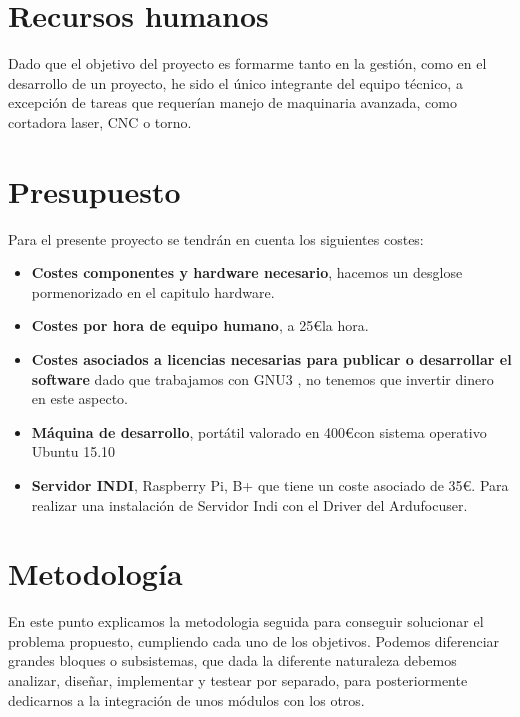 \begin{itemize}
\begin{itemize}
\begin{itemize}
\section{Recursos humanos}

Dado que el objetivo del proyecto es formarme tanto en la gestión, como en el desarrollo de un proyecto, he sido el único integrante del equipo técnico, a excepción de tareas que requerían manejo de maquinaria avanzada, como cortadora laser, CNC o torno. 

\section{Presupuesto}

Para el presente proyecto se tendrán en cuenta los siguientes costes:

\begin{itemize}
	
	\item \textbf{Costes componentes y hardware necesario}, hacemos un desglose pormenorizado en el capitulo hardware.
	
	\item \textbf{Costes por hora de equipo humano}, a 25\euro la hora.
	
	\item \textbf{Costes asociados a licencias necesarias para publicar o desarrollar
	el software} dado que trabajamos con GNU3 \cite{GNU3}, no tenemos que invertir dinero en este aspecto.

	\item \textbf{Máquina de desarrollo}, portátil valorado en 400\euro con sistema operativo Ubuntu 15.10
	
	\item \textbf{Servidor INDI}, Raspberry Pi, B+ que tiene un coste asociado de 35\euro. Para realizar una instalación de Servidor Indi con el Driver del Ardufocuser.
 
\end{itemize}

\section{Metodología}

\bigskip
En este punto explicamos la metodologia seguida para conseguir  solucionar el problema propuesto, cumpliendo cada uno de los objetivos. 
Podemos diferenciar grandes bloques o subsistemas, que dada la diferente naturaleza debemos analizar, diseñar, implementar y testear por separado, para posteriormente dedicarnos a la integración de unos módulos con los otros.


\end{itemize}
\end{itemize}
\end{itemize}
